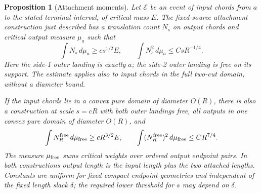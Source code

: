 \documentclass[11pt]{article}
\numberwithin{equation}{section}
\newtheorem{proposition}[theorem]{Proposition}
\theoremstyle{definition}\newtheorem{definition}[theorem]{Definition}
\theoremstyle{remark}\newtheorem{remark}[theorem]{Remark}
\begin{document}
\begin{proposition}[Attachment moments]\label{c:attachment-proposition}
Let $\mathcal E$ be an event of input chords from $a$ to the stated
terminal interval, of critical mass $E$. The fixed-source attachment
construction just described has a translation count $N_s$ on output
chords and critical output measure $\mu_a$ such that
\begin{equation}\label{c:attachment-moments}
 \int N_s\,d\mu_a\ge cs^{1/2}E,
 \qquad
 \int N_s^2\,d\mu_a\le CsR^{-1/4}.
\end{equation}
Here the side-1 outer landing is exactly $a$; the side-2 outer landing
is free on its support. The estimate applies also to input chords in
the full two-cut domain, without a diameter bound.

If the input chords lie in a convex pure domain of diameter $O(R)$,
there is also a construction at scale $s=cR$ with both outer landings
free, all outputs in one convex pure domain of diameter $O(R)$, and
\begin{equation}\label{c:free-attachment-moments}
 \int N_R^{\rm free}\,d\mu_{\rm free}\ge cR^{3/2}E,
 \qquad
 \int(N_R^{\rm free})^2\,d\mu_{\rm free}\le CR^{7/4}.
\end{equation}
The measure $\mu_{\rm free}$ sums critical weights over ordered output
endpoint pairs. In both constructions output length is the input length
plus the two attached lengths. Constants are uniform for fixed compact
endpoint geometries and independent of the fixed length slack $\delta$;
the required lower threshold for $s$ may depend on $\delta$.
\end{proposition}
\end{document}
